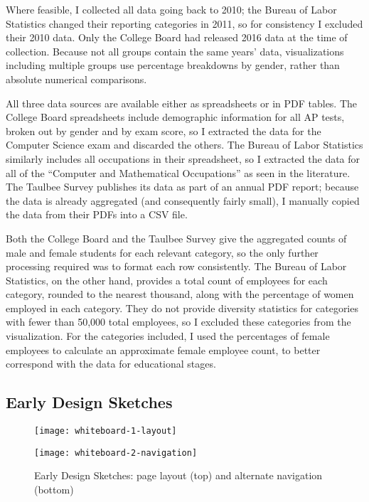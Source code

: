 Where feasible, I collected all data going back to 2010; the Bureau of Labor Statistics changed their reporting categories in 2011, so for consistency I excluded their 2010 data. Only the College Board had released 2016 data at the time of collection. Because not all groups contain the same years' data, visualizations including multiple groups use percentage breakdowns by gender, rather than absolute numerical comparisons.

All three data sources are available either as spreadsheets or in PDF tables. The College Board spreadsheets include demographic information for all AP tests, broken out by gender and by exam score, so I extracted the data for the Computer Science exam and discarded the others. The Bureau of Labor Statistics similarly includes all occupations in their spreadsheet, so I extracted the data for all of the ``Computer and Mathematical Occupations'' as seen in the literature. The Taulbee Survey publishes its data as part of an annual PDF report; because the data is already aggregated (and consequently fairly small), I manually copied the data from their PDFs into a CSV file.

Both the College Board and the Taulbee Survey give the aggregated counts of male and female students for each relevant category, so the only further processing required was to format each row consistently. The Bureau of Labor Statistics, on the other hand, provides a total count of employees for each category, rounded to the nearest thousand, along with the percentage of women employed in each category. They do not provide diversity statistics for categories with fewer than 50,000 total employees, so I excluded these categories from the visualization. For the categories included, I used the percentages of female employees to calculate an approximate female employee count, to better correspond with the data for educational stages.

\subsection{Early Design Sketches}\label{sec:dev-sketches}
\begin{figure}
  \centering
  \texttt{[image: whiteboard-1-layout]}

  \vspace{0.1in}

  \texttt{[image: whiteboard-2-navigation]}
  \caption{Early Design Sketches: page layout (top) and alternate navigation (bottom)}\label{fig:whiteboard}
\end{figure}

